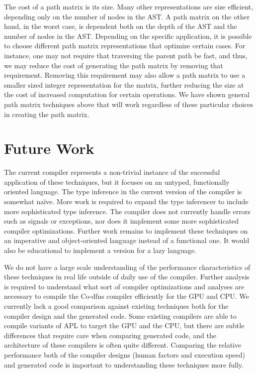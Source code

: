 ﻿\documentclass[numbers,10pt,preprint]{sigplanconf}
\begin{document}
The cost of a path matrix is its size. Many other representations are size efficient, depending only on the number of nodes in the AST. A path matrix on the other hand, in the worst case, is dependent both on the depth of the AST and the number of nodes in the AST. Depending on the specific application, it is possible to choose different path matrix representations that optimize certain cases. For instance, one may not require that traversing the parent path be fast, and thus, we may reduce the cost of generating the path matrix by removing that requirement. Removing this requirement may also allow a path matrix to use a smaller sized integer representation for the matrix, further reducing the size at the cost of increased computation for certain operations. We have shown general path matrix techniques above that will work regardless of these particular choices in creating the path matrix. 

\section{Future Work}

The current compiler represents a non-trivial instance of the successful application of these techniques, but it focuses on an untyped, functionally oriented language. The type inference in the current version of the compiler is somewhat na\"ive. More work is required to expand the type inferencer to include more sophisticated type inference. The compiler does not currently handle errors such as signals or exceptions, nor does it implement some more sophisticated compiler optimizations. Further work remains to implement these techniques on an imperative and object-oriented language instead of a functional one. It would also be educational to implement a version for a lazy language.

We do not have a large scale understanding of the performance characteristics of these techniques in real life outside of daily use of the compiler. Further analysis is required to understand what sort of compiler optimizations and analyses are necessary to compile the Co-dfns compiler efficiently for the GPU and CPU. We currently lack a good comparison against existing techniques both for the compiler design and the generated code. Some existing compilers are able to compile variants of APL to target the GPU and the CPU, but there are subtle differences that require care when comparing generated code, and the architecture of these compilers is often quite different. Comparing the relative performance both of the compiler designs (human factors and execution speed) and generated code is important to understanding these techniques more fully.
\end{document}
